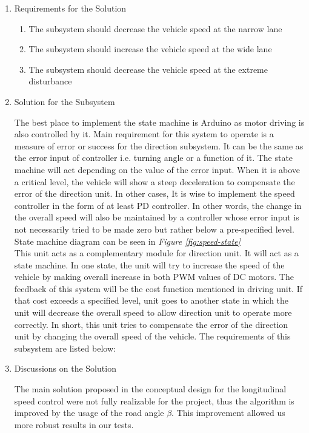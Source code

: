 \documentclass[a4paper,12pt]{article}
\begin{document}
		\begin{enumerate}
			\item {Requirements for the Solution}
			
				\begin{enumerate}
					\item The subsystem should decrease the vehicle speed at the narrow lane 
					\item The subsystem should increase the vehicle speed at the wide lane
					\item The subsystem should decrease the vehicle speed at the extreme disturbance  
				\end{enumerate}
					
			\item {Solution for the Subsystem}
			
			The best place to implement the state machine is Arduino as motor driving is also controlled by it. Main requirement for this system to operate is a measure of error or success for the direction subsystem. It can be the same as the error input of controller i.e. turning angle or a function of it. The state machine will act depending on the value of the error input. When it is above a critical level, the vehicle will show a steep deceleration to compensate the error of the direction unit. In other cases, It is wise to implement the speed controller in the form of at least PD controller. In other words, the change in the overall speed will also be maintained by a controller whose error input is not necessarily tried to be made zero but rather below a pre-specified level. State machine diagram can be seen in \textit{Figure \ref{fig:speed-state}}\\
		
	This unit acts as a complementary module for direction unit. It will act as a state machine. In one state, the unit will try to increase the speed of the vehicle by making overall increase in both PWM values of DC motors. The feedback of this  system will be the cost function mentioned in driving unit. If that cost exceeds a specified level, unit goes to another state in which the unit will decrease the overall speed to allow direction unit to operate more correctly. In short, this unit tries to compensate the error of the direction unit by changing the overall speed of the vehicle. The requirements of this subsystem are listed below:
			
			\item {Discussions on the Solution}
						
	The main solution proposed in the conceptual design for the longitudinal speed control were not fully realizable for the project, thus the algorithm is improved by the usage of the road angle $\beta$. This improvement allowed us more robust results in our tests.
			
		\end{enumerate}
			
\end{document}

